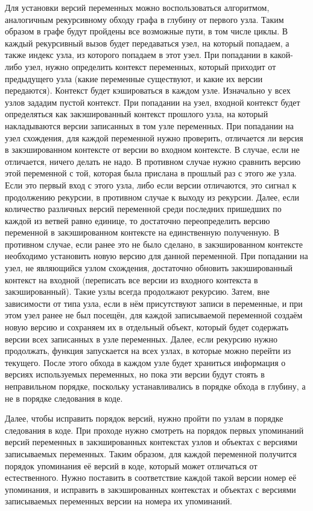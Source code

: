 Для установки версий переменных можно воспользоваться алгоритмом, аналогичным рекурсивному обходу графа в глубину от первого узла. Таким образом в графе будут пройдены все возможные пути, в том числе циклы. В каждый рекурсивный вызов будет передаваться узел, на который попадаем, а также индекс узла, из которого попадаем в этот узел. При попадании в какой-либо узел, нужно определить контекст переменных, который приходит от предыдущего узла (какие переменные существуют, и какие их версии передаются). Контекст будет кэшироваться в каждом узле. Изначально у всех узлов зададим пустой контекст. При попадании на узел, входной контекст будет определяться как закэшированный контекст прошлого узла, на который накладываются версии записанных в том узле переменных. При попадании на узел схождения, для каждой переменной нужно проверить, отличается ли версия в закэшированном контексте от версии во входном контексте. В случае, если не отличается, ничего делать не надо. В противном случае нужно сравнить версию этой переменной с той, которая была прислана в прошлый раз с этого же узла. Если это первый вход с этого узла, либо если версии отличаются, это сигнал к продолжению рекурсии, в противном случае к выходу из рекурсии. Далее, если количество различных версий переменной среди последних пришедших по каждой из ветвей равно единице, то достаточно переопределить версию переменной в закэшированном контексте на единственную полученную. В противном случае, если ранее это не было сделано, в закэшированном контексте необходимо установить новую версию для данной переменной. При попадании на узел, не являющийся узлом схождения, достаточно обновить закэшированный контекст на входной (переписать все версии из входного контекста в закэшированный). Такие узлы всегда продолжают рекурсию. Затем, вне зависимости от типа узла, если в нём присутствуют записи в переменные, и при этом узел ранее не был посещён, для каждой записываемой переменной создаём новую версию и сохраняем их в отдельный объект, который будет содержать версии всех записанных в узле переменных. Далее, если рекурсию нужно продолжать, функция запускается на всех узлах, в которые можно перейти из текущего. После этого обхода в каждом узле будет храниться информация о версиях используемых переменных, но пока эти версии будут стоять в неправильном порядке, поскольку устанавливались в порядке обхода в глубину, а не в порядке следования в коде.

Далее, чтобы исправить порядок версий, нужно пройти по узлам в порядке следования в коде. При проходе нужно смотреть на порядок первых упоминаний версий переменных в закэшированных контекстах узлов и объектах с версиями записываемых переменных. Таким образом, для каждой переменной получится порядок упоминания её версий в коде, который может отличаться от естественного. Нужно поставить в соответствие каждой такой версии номер её упоминания, и исправить в закэшированных контекстах и объектах с версиями записываемых переменных версии на номера их упоминаний.

